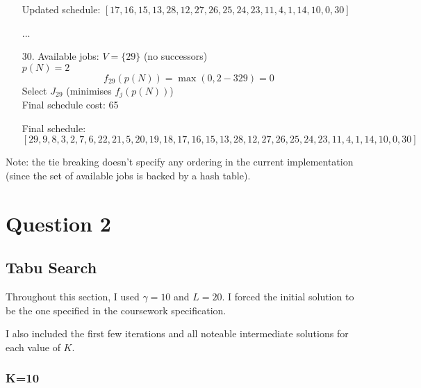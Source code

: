 \documentclass[fleqn]{article}
\begin{document}
\begin{enumerate}
      Updated schedule: $[17, 16, 15, 13, 28, 12, 27, 26, 25, 24, 23, 11, 4, 1, 14, 10, 0, 30]$

      \item[...]

      \item[30.] Available jobs: $V = \{ 29 \}$ (no successors) \\
      $p(N) = 2$
      \[
      f_{29}(p(N)) = \max(0, 2 - 329) = 0
      \]    
      Select $J_{29}$ (minimises $f_j(p(N))$) \\
      Final schedule cost: 65

      Final schedule: $[29, 9, 8, 3, 2, 7, 6, 22, 21, 5, 20, 19, 18, 17, 16, 15, 13, 28, 12, 27, 26, 25, 24, 23, 11, 4, 1, 14, 10, 0, 30]$
    \end{enumerate}

    Note: the tie breaking doesn't specify any ordering in the current implementation (since the set of available jobs is backed by a hash table).

  \section{Question 2}
  \subsection{Tabu Search}
  Throughout this section, I used $\gamma=10$ and $L=20$. I forced the initial solution to be the one specified in the coursework specification.
  
  I also included the first few iterations and all noteable intermediate solutions for each value of $K$.
  \subsubsection{K=10}
\end{document}
